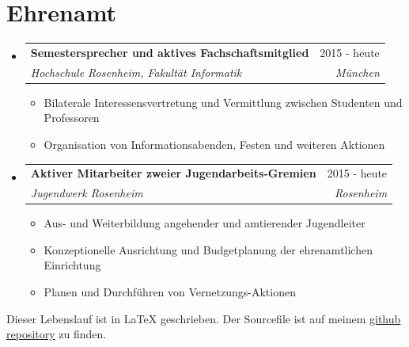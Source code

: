 \documentclass[letterpaper,11pt]{article}
\makeatletter
\newcommand{\resumeItemWithoutHeadline}[1]{
	\item\small{
		{#1 \vspace{-2pt}}
	}
}
\newcommand{\resumeSubheading}[4]{
  \vspace{-1pt}\item
    \begin{tabular*}{0.97\textwidth}[t]{l@{\extracolsep{\fill}}r}
      \textbf{#1} & #2 \\
      \textit{\small#3} & \textit{\small #4} \\
    \end{tabular*}\vspace{-5pt}
}
\newcommand{\resumeSubHeadingListStart}{\begin{itemize}[leftmargin=*]}
\newcommand{\resumeSubHeadingListEnd}{\end{itemize}}
\newcommand{\resumeItemListStart}{\begin{itemize}}
\newcommand{\resumeItemListEnd}{\end{itemize}\vspace{-5pt}}
\makeatother
\begin{document}
\section{Ehrenamt}
  \resumeSubHeadingListStart
  
	\resumeSubheading
	{Semestersprecher und aktives Fachschaftsmitglied}{2015 - heute}
	{Hochschule Rosenheim, Fakultät Informatik}{München}
	\resumeItemListStart
		\resumeItemWithoutHeadline
		{Bilaterale Interessensvertretung und Vermittlung zwischen Studenten und Professoren}
		\resumeItemWithoutHeadline
		{Organisation von Informationsabenden, Festen und weiteren Aktionen}
	\resumeItemListEnd
	
	\resumeSubheading
	{Aktiver Mitarbeiter zweier Jugendarbeits-Gremien}{2015 - heute}
	{Jugendwerk Rosenheim}{Rosenheim}
	\resumeItemListStart
		\resumeItemWithoutHeadline
		{Aus- und Weiterbildung angehender und amtierender Jugendleiter}
		\resumeItemWithoutHeadline
		{Konzeptionelle Ausrichtung und Budgetplanung der ehrenamtlichen Einrichtung}
		\resumeItemWithoutHeadline
		{Planen und Durchführen von Vernetzungs-Aktionen}
	\resumeItemListEnd
	
  \resumeSubHeadingListEnd

  
\raggedleft 
\tiny{Dieser Lebenslauf ist in LaTeX geschrieben. Der Sourcefile ist auf meinem \href{https://github.com/gramsimamsi/resume/blob/master/lukas_grams_resume.tex}{github repository} zu finden. }
\end{document}

